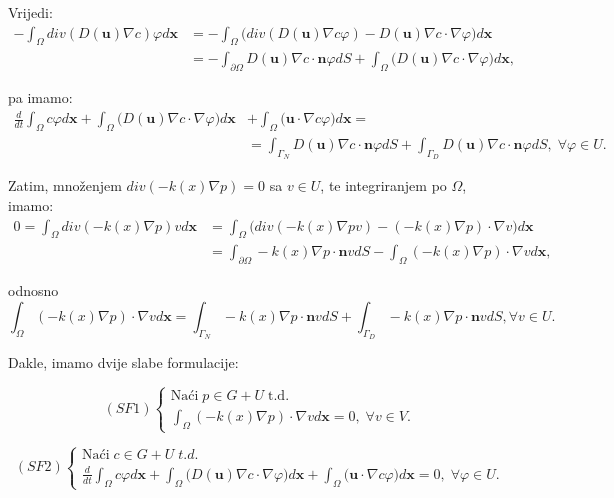 \documentclass[a4paper,12pt]{article}
\begin{document}
Vrijedi:
\begin{align*}
- \int_{\Omega} div(D(\textbf{u}) \nabla c) \varphi d\textbf{x} &= -\int_{\Omega} \Big( div(D(\textbf{u}) \nabla c \varphi) - D(\textbf{u}) \nabla c \cdot \nabla \varphi \Big) d\textbf{x} \\ 
&= -\int_{\partial \Omega} D(\textbf{u}) \nabla c \cdot \textbf{n} \varphi dS + \int_{\Omega} \Big( D(\textbf{u}) \nabla c \cdot \nabla \varphi \Big) d\textbf{x},
\end{align*}

pa imamo:
\begin{align*}
\frac{d}{dt} \int_{\Omega} c \varphi d\textbf{x} + \int_{\Omega} \Big( D(\textbf{u}) \nabla c \cdot \nabla \varphi \big) d\textbf{x} &+ \int_{\Omega} \Big( \textbf{u} \cdot \nabla c \varphi \Big) d\textbf{x} = \\
&= \int_{\Gamma_N} D(\textbf{u}) \nabla c \cdot \textbf{n} \varphi dS + \int_{\Gamma_D} D(\textbf{u}) \nabla c \cdot \textbf{n} \varphi dS, \; \forall \varphi \in U.
\end{align*}

Zatim, množenjem $div(-k(x) \nabla p) = 0$ sa $v \in U$, te integriranjem po $\Omega$, imamo:
\begin{align*}
0 = \int_{\Omega} div(-k(x) \nabla p) v d\textbf{x} &= \int_{\Omega} \Big( div(-k(x) \nabla p v) - (-k(x) \nabla p) \cdot \nabla v \Big) d\textbf{x} \\
&= \int_{\partial \Omega} -k(x) \nabla p \cdot \textbf{n} v dS - \int_{\Omega} (-k(x) \nabla p) \cdot \nabla v d\textbf{x},
\end{align*}

odnosno
\begin{equation*}
\int_{\Omega} (-k(x) \nabla p) \cdot \nabla v d\textbf{x} = \int_{\Gamma_N} -k(x) \nabla p \cdot \textbf{n} v dS + \int_{\Gamma_D} -k(x) \nabla p \cdot \textbf{n} v dS, \forall v \in U.
\end{equation*}

Dakle, imamo dvije slabe formulacije:

\[
	 (SF1) \left\{
		\begin{array}{ll}
			\text{Naći} \; p \in G + U \; \text{t.d.} \\ 
\int_{\Omega} (-k(x) \nabla p) \cdot \nabla v d\textbf{x} = 0, \; \forall v \in V.
		\end{array}
		\right.
\]

\[
	(SF2) \left\{
		\begin{array}{ll}
			\text{Naći} \; c \in G + U \; t.d. \\
			\frac{d}{dt} \int_{\Omega} c\varphi d\textbf{x} + \int_{\Omega} \Big( D(\textbf{u}) \nabla c \cdot \nabla \varphi \big) d\textbf{x} + \int_{\Omega} \Big( \textbf{u} \cdot \nabla c \varphi \Big) d\textbf{x} = 0, \; \forall \varphi \in U.
		\end{array}
		\right.
\]
\end{document}
